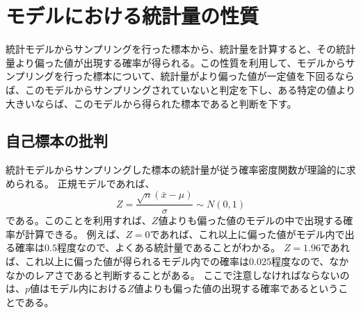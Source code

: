 \chapter{モデルにおける統計量の性質}
統計モデルからサンプリングを行った標本から、統計量を計算すると、その統計量より偏った値が出現する確率が得られる。この性質を利用して、モデルからサンプリングを行った標本について、統計量がより偏った値が一定値を下回るならば、このモデルからサンプリングされていないと判定を下し、ある特定の値より大きいならば、このモデルから得られた標本であると判断を下す。





\section{自己標本の批判}
統計モデルからサンプリングした標本の統計量が従う確率密度関数が理論的に求められる。
正規モデルであれば、
\begin{equation*}
    Z = \frac{\sqrt{n}(\bar{x}-\mu)}{\sigma} \sim N(0,1)
\end{equation*}
である。このことを利用すれば、$Z$値よりも偏った値のモデルの中で出現する確率が計算できる。
例えば、$Z=0$であれば、これ以上に偏った値がモデル内で出る確率は$0.5$程度なので、よくある統計量であることがわかる。
$Z=1.96$であれば、これ以上に偏った値が得られるモデル内での確率は$0.025$程度なので、なかなかのレアさであると判断することがある。
ここで注意しなければならないのは、$p$値はモデル内における$Z$値よりも偏った値の出現する確率であるということである。

